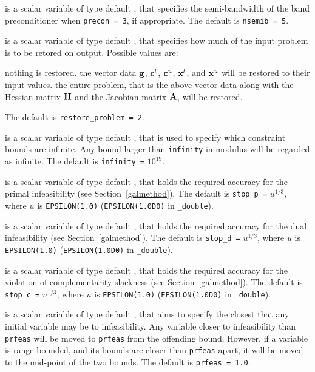 \begin{description}
 is a scalar variable of type default \integer, that specifies
the semi-bandwidth of the band preconditioner when {\tt precon = 3}, 
if appropriate.
The default is {\tt nsemib = 5}.

 is a scalar variable of type default \integer, that 
specifies how much of the input problem is to be retored on output. 
Possible values are:
\begin{description}
 nothing is restored. 
 the vector data ${\mathbf{g}}$, 
   ${\mathbf{c}}^{l}$, ${\mathbf{c}}^{u}$, ${\mathbf{x}}^{l}$, and ${\mathbf{x}}^{u}$ 
   will be restored to their input values.
 the entire problem, that is the above vector data along with 
the Hessian matrix ${\mathbf{H}}$ and the Jacobian matrix ${\mathbf{A}}$, will be restored.
\end{description}
The default is {\tt restore\_problem = 2}.

 is a scalar variable of type default \realdp, that is used to
specify which constraint bounds are infinite.
Any bound larger than {\tt infinity} in modulus will be regarded as infinite.
The default is {\tt infinity =} $10^{19}$.

 is a scalar variable of type default \realdp, that holds the
required accuracy for the primal infeasibility (see Section~\ref{galmethod}).
The default is {\tt stop\_p =} $u^{1/3}$,
where $u$ is {\tt EPSILON(1.0)} ({\tt EPSILON(1.0D0)} in 
{\tt \fullpackagename\_double}).

 is a scalar variable of type default 
\realdp, that holds the
required accuracy for the dual infeasibility (see Section~\ref{galmethod}).
The default is {\tt stop\_d =} $u^{1/3}$,
where $u$ is {\tt EPSILON(1.0)} ({\tt EPSILON(1.0D0)} in 
{\tt \fullpackagename\_double}).

 is a scalar variable of type default 
\realdp, that holds the
required accuracy for the violation of complementarity slackness 
(see Section~\ref{galmethod}).
The default is {\tt stop\_c =} $u^{1/3}$,
where $u$ is {\tt EPSILON(1.0)} ({\tt EPSILON(1.0D0)} in 
{\tt \fullpackagename\_double}).

 is a scalar variable of type default \realdp, that aims to specify
the closest that any initial variable may be to infeasibility. Any variable
closer to infeasibility than {\tt prfeas} will be moved to {\tt prfeas} from 
the offending bound. However, if a variable is range bounded, and its bounds 
are closer than {\tt prfeas} apart, it will be moved to the mid-point of the 
two bounds.
The default is {\tt prfeas = 1.0}.


\end{description}
